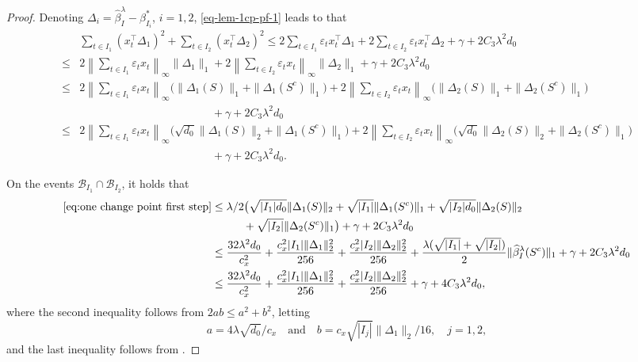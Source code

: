 \documentclass[twoside]{article}
\begin{document}
\begin{proof}
Denoting $\Delta_i = \widehat{\beta}^\lambda_{I} - \beta_{I_i}^*$, $i = 1, 2$, \eqref{eq-lem-1cp-pf-1} leads to that  
	\begin{align}
		& \sum_{t\in I_1} (x_t^{\top}\Delta_1)^2 + \sum_{t\in I _2 } (x_t^{\top}\Delta_2)^2 \leq 2\sum_{t\in I_1} \varepsilon_t x_t^{\top} \Delta_1 + 2\sum_{t\in I_2} \varepsilon_t x_t^{\top} \Delta_2  + \gamma + 2C_3 \lambda^2 d_0 \nonumber \\
		\leq & 2 \left\|\sum_{t\in I_1} \varepsilon_t x_t  \right\|_{\infty} \|\Delta_1\|_1 + 2 \left\|\sum_{t\in I_2} \varepsilon_t x_t  \right\|_{\infty} \|\Delta_2\|_1 + \gamma + 2C_3 \lambda^2 d_0 \nonumber \\
		\leq & 2 \left\|\sum_{t\in I_1} \varepsilon_t x_t  \right\|_{\infty} \bigl(\|\Delta_1(S)\|_1 + \|\Delta_1(S^c)\|_1\bigr) + 2 \left\|\sum_{t\in I_2} \varepsilon_t x_t  \right\|_{\infty} \bigl(\|\Delta_2(S)\|_1 + \|\Delta_2(S^c)\|_1\bigr) \nonumber \\
		& \hspace{5cm} + \gamma + 2C_3 \lambda^2 d_0 \nonumber \\
		\leq & 2 \left\|\sum_{t\in I_1} \varepsilon_t x_t  \right\|_{\infty} \bigl(\sqrt{d_0}\|\Delta_1(S)\|_2 + \|\Delta_1(S^c)\|_1\bigr) + 2 \left\|\sum_{t\in I_2} \varepsilon_t x_t  \right\|_{\infty} \bigl(\sqrt{d_0}\|\Delta_2(S)\|_2 + \|\Delta_2(S^c)\|_1\bigr) \nonumber \\
		& \hspace{5cm} + \gamma + 2C_3 \lambda^2 d_0.\label{eq:one change point first step}
	\end{align}
	
On the events $\mathcal{B}_{I_1} \cap \mathcal{B}_{I_2}$, it holds that
	\begin{align}
		\eqref{eq:one change point first step} & \leq \lambda/2 \big(\sqrt{|I_1|d_0}\|\Delta_1(S)\|_2 + \sqrt{|I_1|}\|\Delta_1(S^c)\|_1 + \sqrt{|I_2|d_0} \|\Delta_2(S)\|_2 \nonumber \\
		& \hspace{1cm} + \sqrt{|I_2|}\|\Delta_2(S^c)\|_1\big) + \gamma + 2C_3 \lambda^2 d_0 \nonumber \\
		& \leq \frac{32 \lambda^2 d_0}{c_x^2} + \frac{c_x^2 |I_1| \|\Delta_1\|_2^2}{256} + \frac{c_x^2 |I_2| \|\Delta_2\|_2^2}{256} + \frac{\lambda (\sqrt{|I_1|} + \sqrt{|I_2|})}{2} \|\widehat{\beta}^{\lambda}_I(S^c)\|_1 + \gamma + 2C_3 \lambda^2 d_0 \nonumber \\
		& \leq \frac{32 \lambda^2 d_0}{c_x^2} + \frac{c_x^2 |I_1| \|\Delta_1\|_2^2}{256} + \frac{c_x^2 |I_2| \|\Delta_2\|_2^2}{256} + \gamma + 4C_3 \lambda^2 d_0, \label{eq-upper-long}
	\end{align}
	where the second inequality follows from $2ab \leq a^2 + b^2$, letting
	\[
		a = 4\lambda \sqrt{d_0}/c_x \quad \mbox{and} \quad b = c_x \sqrt{|I_j|}\|\Delta_1\|_2/16, \quad j = 1, 2,
	\]
	and the last inequality follows from .


\end{proof}
\end{document}
